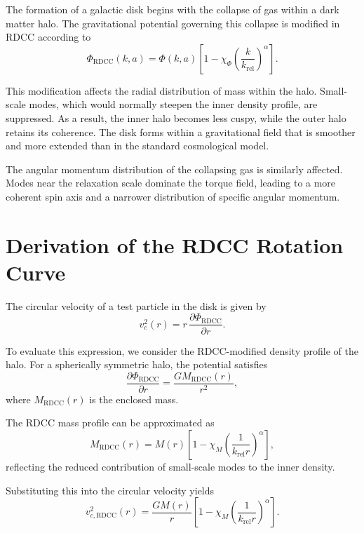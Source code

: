 \documentclass[11pt,a4paper]{article}
\begin{document}
The formation of a galactic disk begins with the collapse of gas within a dark 
matter halo. The gravitational potential governing this collapse is modified in 
RDCC according to
\begin{equation}
    \Phi_{\mathrm{RDCC}}(k,a)
    = \Phi(k,a)
      \left[1 - \chi_{\Phi}
      \left(\frac{k}{k_{\mathrm{rel}}}\right)^{\alpha}\right].
\end{equation}

This modification affects the radial distribution of mass within the halo. 
Small-scale modes, which would normally steepen the inner density profile, are 
suppressed. As a result, the inner halo becomes less cuspy, while the outer halo 
retains its coherence. The disk forms within a gravitational field that is smoother 
and more extended than in the standard cosmological model.

The angular momentum distribution of the collapsing gas is similarly affected. 
Modes near the relaxation scale dominate the torque field, leading to a more 
coherent spin axis and a narrower distribution of specific angular momentum.
\section{Derivation of the RDCC Rotation Curve}

The circular velocity of a test particle in the disk is given by
\begin{equation}
    v_{c}^{2}(r)
    = r\,\frac{\partial \Phi_{\mathrm{RDCC}}}{\partial r}.
\end{equation}

To evaluate this expression, we consider the RDCC-modified density profile of the 
halo. For a spherically symmetric halo, the potential satisfies
\begin{equation}
    \frac{\partial \Phi_{\mathrm{RDCC}}}{\partial r}
    = \frac{G M_{\mathrm{RDCC}}(r)}{r^{2}},
\end{equation}
where $M_{\mathrm{RDCC}}(r)$ is the enclosed mass.

The RDCC mass profile can be approximated as
\begin{equation}
    M_{\mathrm{RDCC}}(r)
    = M(r)
      \left[
        1 - \chi_{M}
        \left(\frac{1}{k_{\mathrm{rel}} r}\right)^{\alpha}
      \right],
\end{equation}
reflecting the reduced contribution of small-scale modes to the inner density.

Substituting this into the circular velocity yields
\begin{equation}
    v_{c,\mathrm{RDCC}}^{2}(r)
    = \frac{G M(r)}{r}
      \left[
        1 - \chi_{M}
        \left(\frac{1}{k_{\mathrm{rel}} r}\right)^{\alpha}
      \right].
\end{equation}
\end{document}
